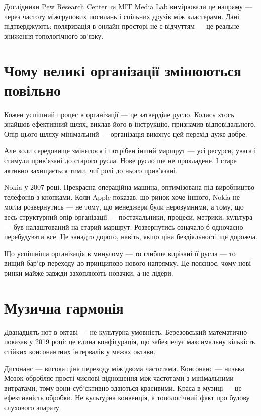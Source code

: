 \documentclass[12pt, a4paper, openany]{book}
\begin{document}
Дослідники Pew Research Center та MIT Media Lab вимірювали це напряму --- через частоту міжгрупових посилань і спільних друзів між кластерами. Дані підтверджують: поляризація в онлайн-просторі не є відчуттям --- це реальне зниження топологічного зв'язку.

\section{Чому великі організації змінюються повільно}

Кожен успішний процес в організації --- це затверділе русло. Колись хтось знайшов ефективний шлях, виклав його в інструкцію, призначив відповідального. Опір цього шляху мінімальний --- організація виконує цей перехід дуже добре.

Але коли середовище змінилося і потрібен інший маршрут --- усі ресурси, увага і стимули прив'язані до старого русла. Нове русло ще не прокладене. І старе активно захищається тими, чиї ролі до нього прив'язані.

\begin{analogybox}
Nokia у 2007 році. Прекрасна операційна машина, оптимізована під виробництво телефонів з кнопками. Коли Apple показав, що ринок хоче іншого, Nokia не могла розвернутись --- не тому, що менеджери були нерозумними, а тому, що весь структурний опір організації --- постачальники, процеси, метрики, культура --- був налаштований на старий маршрут. Розвернутись означало б одночасно перебудувати все. Це занадто дорого, навіть, якщо ціна бездіяльності ще дорожча.
\end{analogybox}

Що успішніша організація в минулому --- то глибше вирізані її русла --- то вищий бар'єр переходу до принципово нового напрямку. Це пояснює, чому нові ринки майже завжди захоплюють новачки, а не лідери.

\section{Музична гармонія}

Дванадцять нот в октаві --- не культурна умовність. Березовський математично показав у 2019 році: це єдина конфігурація, що забезпечує максимальну кількість стійких консонантних інтервалів у межах октави.

Дисонанс --- висока ціна переходу між двома частотами. Консонанс --- низька. Мозок обробляє прості числові відношення між частотами з мінімальними витратами, тому вони суб'єктивно здаються красивими. Краса в музиці --- це ефективність обробки. Не культурна конвенція, а топологічний факт про будову слухового апарату.
\end{document}
